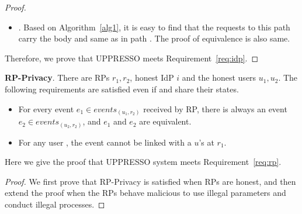 \begin{appendices}
\begin{proof}
\begin{itemize}
\item {}. Based on Algorithm~\ref{alg1}, it is easy to find that the requests to this path carry the body  and  same as in path . The proof of equivalence is also same.
\end{itemize}
Therefore, we prove that UPPRESSO meets Requirement~\ref{req:idp}.
\end{proof}

\begin{req}
\textbf{RP-Privacy}. There are RPs $r_1, r_2$, honest IdP $i$ and the honest users $u_1, u_2$. The following requirements are satisfied even if  and  share their states.
\begin{itemize}
\item For every event $e_1 \in events_{(u_1, r_2)}$ received by RP, there is always an  event $e_2 \in events_{(u_2, r_2)}$, and $e_1$ and $e_2$ are equivalent.
\item For any user , the event  cannot be linked with a $u$'s  at $r_1$.
\end{itemize}
\label{req:rp}
\end{req}
Here we give the proof that UPPRESSO system meets Requirement~\ref{req:rp}.
\begin{proof}
We first prove that RP-Privacy is satisfied when RPs are honest, and then extend the proof when the RPs behave malicious to use illegal parameters and conduct illegal processes.



\end{proof}
\end{appendices}

